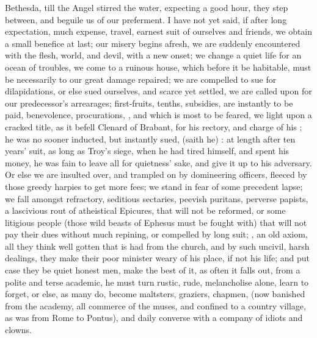 Bethesda, till the Angel stirred the water, expecting a
good hour, they step between, and beguile us of our preferment. I have not yet
said, if after long expectation, much expense, travel, earnest suit of
ourselves and friends, we obtain a small benefice at last; our misery begins
afresh, we are suddenly encountered with the flesh, world, and devil, with a
new onset; we change a quiet life for an ocean of troubles, we come to a
ruinous house, which before it be habitable, must be necessarily to our great
damage repaired; we are compelled to sue for dilapidations, or else sued
ourselves, and scarce yet settled, we are called upon for our predecessor's
arrearages; first-fruits, tenths, subsidies, are instantly to be paid,
benevolence, procurations, \etc{}, and which is most to be feared, we light
upon a cracked title, as it befell Clenard of Brabant, for his rectory, and
charge of his ; he was no sooner inducted, but instantly sued,
 (saith he) : at length after ten years' suit, as long as
Troy's siege, when he had tired himself, and spent his money, he was fain to
leave all for quietness' sake, and give it up to his adversary. Or else we are
insulted over, and trampled on by domineering officers, fleeced by those greedy
harpies to get more fees; we stand in fear of some precedent lapse; we fall
amongst refractory, seditious sectaries, peevish puritans, perverse papists, a
lascivious rout of atheistical Epicures, that will not be reformed, or some
litigious people (those wild beasts of Ephesus must be fought with) that will
not pay their dues without much repining, or compelled by long suit; , an old axiom, all they think well gotten that is had
from the church, and by such uncivil, harsh dealings, they make their poor
minister weary of his place, if not his life; and put case they be quiet honest
men, make the best of it, as often it falls out, from a polite and terse
academic, he must turn rustic, rude, melancholise alone, learn to forget, or
else, as many do, become maltsters, graziers, chapmen, \etc{} (now banished
from the academy, all commerce of the muses, and confined to a country village,
as \Ovid{} was from Rome to Pontus), and daily converse with a company of idiots
and clowns.

